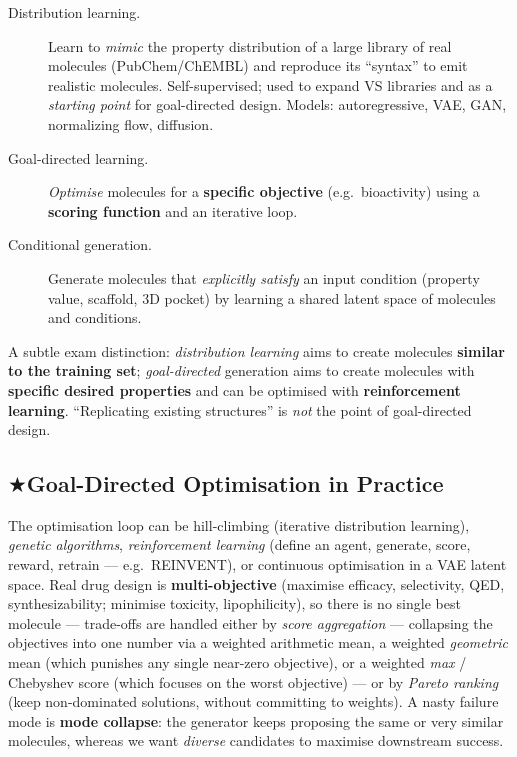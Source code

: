 \documentclass[11pt, oneside]{book}
\makeatletter
\newcommand{\starglyph}{\textcolor{stargold}{\ensuremath{\bigstar}}}
\newcommand{\starsec}[1]{%
  \texorpdfstring{\starglyph\hspace{0.4em}\textcolor{star@frame}{#1}}{#1}}
\makeatother
\begin{document}
\begin{description}
  \item[Distribution learning.] Learn to \emph{mimic} the property distribution of a
        large library of real molecules (PubChem/ChEMBL) and reproduce its
        ``syntax'' to emit realistic molecules. Self-supervised; used to expand VS
        libraries and as a \emph{starting point} for goal-directed design. Models:
        autoregressive, VAE, GAN, normalizing flow, diffusion.
  \item[Goal-directed learning.] \emph{Optimise} molecules for a \textbf{specific
        objective} (e.g.\ bioactivity) using a \textbf{scoring function} and an
        iterative loop.
  \item[Conditional generation.] Generate molecules that \emph{explicitly satisfy}
        an input condition (property value, scaffold, 3D pocket) by learning a
        shared latent space of molecules and conditions.
\end{description}

\begin{notebox}[title={Distribution learning vs.\ goal-directed}]
A subtle exam distinction: \emph{distribution learning} aims to create molecules
\textbf{similar to the training set}; \emph{goal-directed} generation aims to create
molecules with \textbf{specific desired properties} and can be optimised with
\textbf{reinforcement learning}. ``Replicating existing structures'' is \emph{not}
the point of goal-directed design.
\end{notebox}

\subsection{\starsec{Goal-Directed Optimisation in Practice}}

The optimisation loop can be hill-climbing (iterative distribution learning),
\emph{genetic algorithms}, \emph{reinforcement learning} (define an agent, generate,
score, reward, retrain --- e.g.\ REINVENT), or continuous optimisation in a VAE
latent space. Real drug design is \textbf{multi-objective} (maximise efficacy,
selectivity, QED, synthesizability; minimise toxicity, lipophilicity), so there is
no single best molecule --- trade-offs are handled either by \emph{score aggregation}
--- collapsing the objectives into one number via a weighted arithmetic mean, a
weighted \emph{geometric} mean (which punishes any single near-zero objective), or a
weighted \emph{max} / Chebyshev score (which focuses on the worst objective) --- or by
\emph{Pareto ranking} (keep non-dominated solutions, without committing to weights). A nasty
failure mode is \textbf{mode collapse}: the generator keeps proposing the same or
very similar molecules, whereas we want \emph{diverse} candidates to maximise
downstream success.
\end{document}
